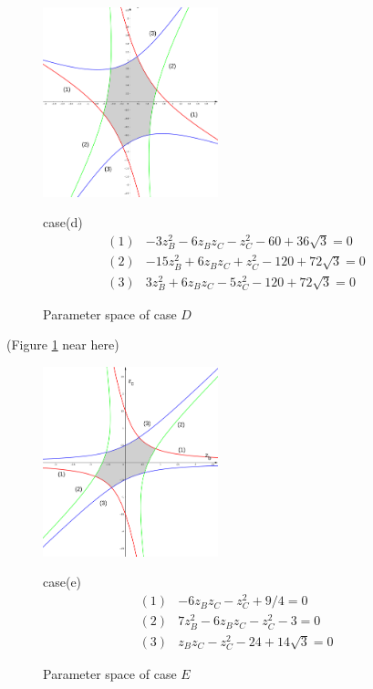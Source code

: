 \documentclass[suppldata, dvipdfmx]{interact}
\theoremstyle{plain}%
\theoremstyle{definition}
\theoremstyle{remark}
\theoremstyle{problemstyle}
\begin{document}
\begin{figure}[h!tbp]
 \begin{minipage}[]{0.5\textwidth}
 \centering
 \includegraphics[width=2in,
 keepaspectratio]{./img/graph/cubeD.jpg}
 \caption{Parameter space of case $D$}
 \label{fig:graphCubeD}
 \end{minipage}
 \hspace*{\fill}
 \begin{minipage}[]{0.5\textwidth}
  \centering
  case(d)
  \begin{align*}
   (1)& -3z_B^2 - 6z_B z_C - z_C^2 -60 +36\sqrt{3} = 0\\
   (2)& -15 z_B^2 + 6z_Bz_C + z_C^2 - 120 + 72\sqrt{3} = 0\\
   (3)& 3z_B^2 + 6z_Bz_C - 5z_C^2 - 120 + 72 \sqrt{3} = 0
  \end{align*}
 \end{minipage}
 \hspace*{\fill}
\end{figure}

\noindent(Figure \ref{fig:graphCubeD} near here)

\begin{figure}[h!tbp]
 \begin{minipage}[]{0.5\textwidth}
 \centering
 \includegraphics[width=2in,
 keepaspectratio]{./img/graph/cubeE.jpg}
 \caption{Parameter space of case $E$}
 \label{fig:graphCubeE}
 \end{minipage}
 \hspace*{\fill}
 \begin{minipage}[]{0.5\textwidth}
  \centering
  case(e)
  \begin{align*}
   (1)& -6z_Bz_C - z_C^2 + 9/4 = 0\\
   (2)& 7z_B^2 - 6z_Bz_C - z_C^2 - 3 = 0\\
   (3)& z_Bz_C - z_C^2 - 24 + 14\sqrt{3} = 0
  \end{align*}
 \end{minipage}
 \hspace*{\fill}
\end{figure}
\end{document}

